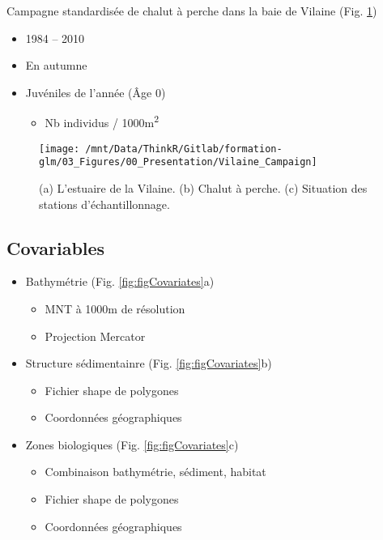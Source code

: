 \documentclass[french,a4paper]{article}
\providecommand{\tightlist}{%
  \setlength{\itemsep}{0pt}\setlength{\parskip}{0pt}}
\begin{document}
Campagne standardisée de chalut à perche dans la baie de Vilaine (Fig. \ref{fig:figVilaineCampaign})

\begin{itemize}
\tightlist
\item
  1984 -- 2010
\item
  En autumne
\item
  Juvéniles de l'année (Âge 0)

  \begin{itemize}
  \tightlist
  \item
    Nb individus / 1000m\textsuperscript{2}
  \end{itemize}
\end{itemize}



\begin{figure}[!h]

{\centering \texttt{[image: /mnt/Data/ThinkR/Gitlab/formation-glm/03\_Figures/00\_Presentation/Vilaine\_Campaign]} 

}

\caption{(a) L'estuaire de la Vilaine. (b) Chalut à perche. (c) Situation des stations d'échantillonnage.}\label{fig:figVilaineCampaign}
\end{figure}

\hypertarget{covariables}{%
\subsection{Covariables}\label{covariables}}

\begin{itemize}
\tightlist
\item
  Bathymétrie (Fig. \ref{fig:figCovariates}a)

  \begin{itemize}
  \tightlist
  \item
    MNT à 1000m de résolution
  \item
    Projection Mercator
  \end{itemize}
\item
  Structure sédimentainre (Fig. \ref{fig:figCovariates}b)

  \begin{itemize}
  \tightlist
  \item
    Fichier shape de polygones
  \item
    Coordonnées géographiques
  \end{itemize}
\item
  Zones biologiques (Fig. \ref{fig:figCovariates}c)

  \begin{itemize}
  \tightlist
  \item
    Combinaison bathymétrie, sédiment, habitat
  \item
    Fichier shape de polygones
  \item
    Coordonnées géographiques
  \end{itemize}
\end{itemize}
\end{document}
